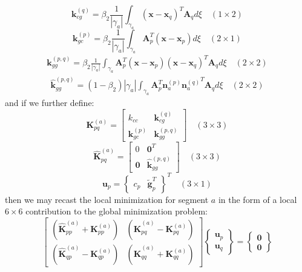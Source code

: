 \documentclass[11pt]{article} %
\begin{document}
\begin{equation}
	\mathbf{k}_{cg}^{(q)} = \beta_2 \frac{1}{| \gamma_a |} \int_{\gamma_a} (\mathbf{x} - \mathbf{x}_q)^T \mathbf{A}_q d \xi \quad (1 \times 2)
\end{equation}
\begin{equation}
	\mathbf{k}_{gc}^{(p)} = \beta_2 \frac{1}{| \gamma_a |} \int_{\gamma_a} \mathbf{A}^T_p (\mathbf{x} - \mathbf{x}_p) d \xi \quad (2 \times 1)
\end{equation}
\begin{eqnarray}
	\mathbf{k}_{gg}^{(p,q)} = \beta_2 \frac{1}{| \gamma_a |} \int_{\gamma_a} \mathbf{A}^T_p (\mathbf{x} - \mathbf{x}_p) (\mathbf{x} - \mathbf{x}_q)^T \mathbf{A}_q d \xi \quad (2 \times 2)
\end{eqnarray}
\begin{eqnarray}
	\hat{\mathbf{k}}_{gg}^{(p,q)} = (1-\beta_2) | \gamma_a | \int_{\gamma_a} \mathbf{A}^T_p {\mathbf{n}_a^{(p)}} {\mathbf{n}^{(q)}_a}^T \mathbf{A}_q d \xi \quad (2 \times 2)
\end{eqnarray}
and if we further define:
\begin{equation}
	\mathbf{K}_{pq}^{(a)} = \left[ \begin{array}{cc} k_{cc} & \mathbf{k}_{cg}^{(q)} \\ \mathbf{k}_{gc}^{(p)} & \mathbf{k}_{gg}^{(p,q)} \end{array} \right] \quad (3 \times 3)
\end{equation}
\begin{equation}
	\hat{\mathbf{K}}_{pq}^{(a)} = \left[ \begin{array}{cc} 0 & \mathbf{0}^T \\ \mathbf{0} & \hat{\mathbf{k}}_{gg}^{(p,q)} \end{array} \right] \quad (3 \times 3)
\end{equation}
\begin{equation}
	\mathbf{u}_p = \left\{ \begin{array}{cc} c_p & \tilde{\mathbf{g}}^T_p \end{array} \right\}^T \quad (3 \times 1)
\end{equation}
then we may recast the local minimization for segment $a$ in the form of a local $6\times6$ contribution to the global minimization problem:
\begin{equation}
	\left[ \begin{array}{cc} (\hat{\mathbf{K}}_{pp}^{(a)} + \mathbf{K}_{pp}^{(a)}) & (\hat{\mathbf{K}}_{pq}^{(a)}-\mathbf{K}_{pq}^{(a)}) \\ (\hat{\mathbf{K}}_{qp}^{(a)}-\mathbf{K}_{qp}^{(a)}) & (\hat{\mathbf{K}}_{qq}^{(a)}+\mathbf{K}_{qq}^{(a)}) \end{array} \right] \left\{ \begin{array}{c} \mathbf{u}_p \\ \mathbf{u}_q \end{array} \right\} = \left\{ \begin{array}{c} \mathbf{0} \\ \mathbf{0} \end{array} \right\}
\end{equation}
\end{document}
